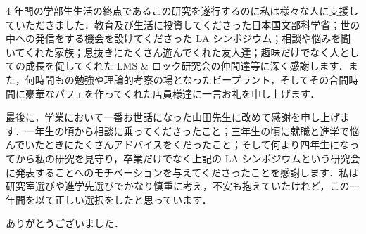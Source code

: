 4 年間の学部生生活の終点であるこの研究を遂行するのに私は様々な人に支援していただきました．教育及び生活に投資してくださった日本国文部科学省；世の中への発信をする機会を設けてくださった LA シンポジウム；相談や悩みを聞いてくれた家族；息抜きにたくさん遊んでくれた友人達；趣味だけでなく人としての成長を促してくれた LMS \& ロック研究会の仲間達等に深く感謝します．また，何時間もの勉強や理論的考察の場となったビープラント，そしてその合間時間に豪華なパフェを作ってくれた店員様達に一言お礼を申し上げます．

最後に，学業において一番お世話になった山田先生に改めて感謝を申し上げます．一年生の頃から相談に乗ってくださったこと；三年生の頃に就職と進学で悩んでいたときにたくさんアドバイスをくだったこと；そして何より四年生になってから私の研究を見守り，卒業だけでなく上記の LA シンポジウムという研究会に発表することへのモチベーションを与えてくださったことを感謝します．私は研究室選びや進学先選びでかなり慎重に考え，不安も抱えていたけれど，この一年間を以て正しい選択をしたと思っています．

ありがとうございました．